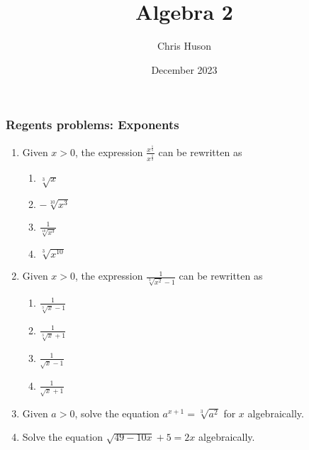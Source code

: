 \documentclass[12pt, twoside]{article}
\title{Algebra 2}
\author{Chris Huson}
\date{December 2023}
\begin{document}
\subsubsection*{Regents problems: Exponents}
\begin{enumerate}[itemsep=1.5cm]
\item Given $x > 0$, the expression $\displaystyle \frac{x^{\frac{1}{5}}}{x^{\frac{1}{2}}}$ can be rewritten as %
\begin{enumerate}
    \item $\sqrt[3]{x}$
    \item $-\sqrt[10]{x^3}$
    \item $\displaystyle \frac{1}{\sqrt[10]{x^3}}$
    \item $\sqrt[3]{x^{10}}$
\end{enumerate}

\item Given $x > 0$, the expression $\displaystyle \frac{1}{\sqrt[3]{x^2} - 1}$ can be rewritten as %
\begin{enumerate}
    \item $\displaystyle \frac{1}{\sqrt[3]{x} - 1}$
    \item $\displaystyle \frac{1}{\sqrt[3]{x} + 1}$
    \item $\displaystyle \frac{1}{\sqrt{x} - 1}$
    \item $\displaystyle \frac{1}{\sqrt{x} + 1}$
\end{enumerate}

\item Given $a > 0$, solve the equation $a^{x+1} = \sqrt[3]{a^2}$ for $x$ algebraically. %

\newpage
\item Solve the equation $\sqrt{49-10x} +5 = 2x$ algebraically. %


\end{enumerate}
\end{document}
